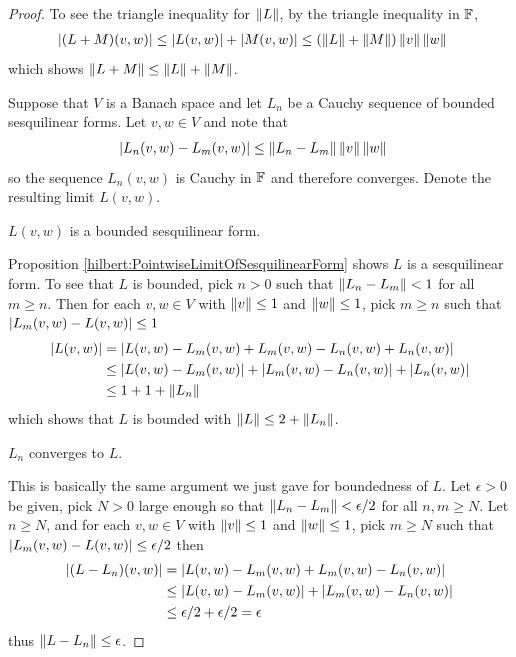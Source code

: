 \begin{proof}
To see the triangle inequality for $\left \lVert L \right \rVert$,  by the triangle inequality in $\mathbb{F}$,
\begin{align*}
\left \vert (L+M)(v,w) \right \vert &\leq \left \vert L(v,w) \right \vert + \left \vert M(v,w) \right \vert \leq (\left \lVert L \right \rVert+\left \lVert M \right \rVert) \left \lVert v \right \rVert \left \lVert w \right \rVert
\end{align*}
which shows $\left \lVert L+M \right \rVert \leq \left \lVert L \right \rVert+\left \lVert M \right \rVert$.

Suppose that $V$ is a Banach space and let $L_n$ be a Cauchy sequence of
bounded sesquilinear forms.   Let $v,w \in V$ and note that
\begin{align*}
  \left \vert L_n(v,w) - L_m(v,w) \right \vert &\leq \left \lVert L_n - L_m \right \rVert \left \lVert v \right \rVert \left \lVert w \right \rVert
\end{align*}
so the sequence $L_n(v,w)$ is Cauchy in $\mathbb{F}$ and therefore
converges.   Denote the resulting limit $L(v,w)$.
\begin{clm} $L(v,w)$ is a bounded sesquilinear form.
\end{clm}
Proposition \ref{hilbert:PointwiseLimitOfSesquilinearForm} shows $L$ is a sesquilinear form.
To see that $L$ is bounded, pick $n>0$ such that $\left \lVert L_n - L_m \right \rVert < 1$ for all $m \geq n$.
Then for each $v,w \in V$ with $\left \lVert v \right \rVert \leq 1$ and $\left \lVert w \right \rVert \leq
1$, pick $m \geq n$ such that $\left \vert L_m(v,w) - L(v,w) \right \vert \leq 1$
\begin{align*}
  \left \vert L(v, w) \right \vert &= \left \vert L(v,w) - L_m(v,w) + L_m(v,w) - L_n(v,w) + L_n(v,w) \right \vert \\
  &\leq \left \vert L(v,w) - L_m(v,w) \right \vert + \left \vert L_m(v,w) - L_n(v,w) \right \vert +
    \left \vert L_n(v,w) \right \vert \\
  &\leq 1 + 1 + \left \lVert L_n \right \rVert
\end{align*}
which shows that $L$ is bounded with $\left \lVert L \right \rVert \leq 2 + \left \lVert L_n \right \rVert$.
\begin{clm} $L_n$ converges to $L$.
\end{clm}
This is basically the same argument we just gave for boundedness of
$L$.  Let $\epsilon > 0$ be given, pick $N>0$ large enough so that
$\left \lVert L_n - L_m \right \rVert < \epsilon/2$ for all $n,m \geq N$.   Let $n \geq
N$, and for each $v,w \in V$ with $\left \lVert v \right \rVert \leq 1$ and $\left \lVert w \right \rVert \leq
1$, pick $m \geq N$ such that $\left \vert L_m(v,w) - L(v,w) \right \vert \leq
\epsilon/2$
then
\begin{align*}
  \left \vert (L - L_n)(v,w) \right \vert &= \left \vert L(v,w) - L_m(v,w) + L_m(v,w) - L_n(v,w) \right \vert \\
  &\leq \left \vert L(v,w) - L_m(v,w) \right \vert + \left \vert L_m(v,w) - L_n(v,w) \right \vert \\
  &\leq \epsilon/2 + \epsilon/2 = \epsilon
\end{align*}
thus $\left \lVert L - L_n \right \rVert \leq \epsilon$.
\end{proof}

